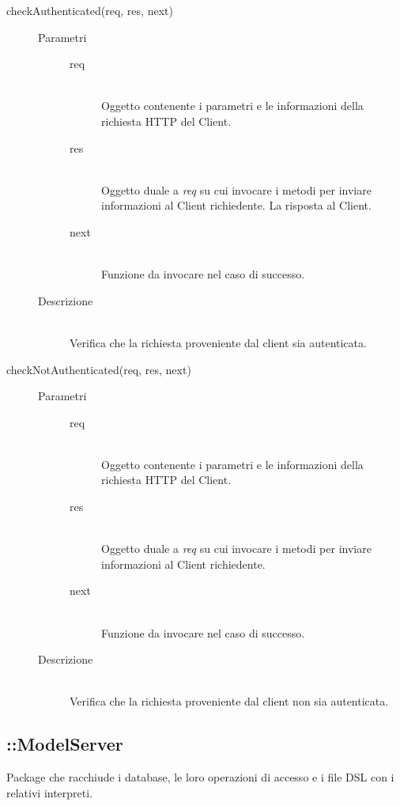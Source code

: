 \begin{description}
\begin{description}
     \item[checkAuthenticated(req, res, next)] \hfill 
     \begin{description}
      \item[Parametri] \hfill
      \begin{description}
       \item[req] \hfill \\
	    Oggetto contenente i parametri e le informazioni della richiesta HTTP del Client.
	    \item[res] \hfill \\
	    Oggetto duale a \textit{req} su cui invocare i metodi per inviare informazioni al Client richiedente.
        La risposta al Client.
       \item[next] \hfill \\
        Funzione da invocare nel caso di successo.
      \end{description}
      \item[Descrizione] \hfill \\
      Verifica che la richiesta proveniente dal client sia autenticata.
     \end{description}
     
     \item[checkNotAuthenticated(req, res, next)] \hfill 
     \begin{description}
      \item[Parametri] \hfill
      \begin{description}
       \item[req] \hfill \\
	    Oggetto contenente i parametri e le informazioni della richiesta HTTP del Client.
	   \item[res] \hfill \\
	    Oggetto duale a \textit{req} su cui invocare i metodi per inviare informazioni al Client richiedente.
       \item[next] \hfill \\
        Funzione da invocare nel caso di successo.
      \end{description}
      \item[Descrizione] \hfill \\
      Verifica che la richiesta proveniente dal client non sia autenticata.
     \end{description}
  \end{description}
\end{description}

\subsection{::ModelServer}
Package che racchiude i database, le loro operazioni di accesso e i file DSL con i relativi interpreti.

